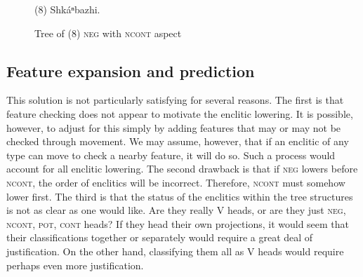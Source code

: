 \documentclass[output=paper]{LSP/langsci}
\begin{document}
\begin{figure}
\caption{Tree of (8) \textsc{neg} with \textsc{ncont} aspect} \label{treeof8}
\begin{center}
(8)	Shkáⁿbazhi.	

\end{center}
\end{figure}

\subsection{Feature expansion and prediction}
This solution is not particularly satisfying for several reasons. The first is that feature checking does not appear to motivate the enclitic lowering. It is possible, however, to adjust for this simply by adding features that may or may not be checked through movement. We may assume, however, that if an enclitic of any type can move to check a nearby feature, it will do so. Such a process would account for all enclitic lowering. The second drawback is that if \textsc{neg} lowers before \textsc{ncont}, the order of enclitics will be incorrect. Therefore, \textsc{ncont} must somehow lower first. The third is that the status of the enclitics within the tree structures is not as clear as one would like. Are they really V heads, or are they just \textsc{neg, ncont, pot, cont} heads? If they head their own projections, it would seem that their classifications together or separately would require a great deal of justification. On the other hand, classifying them all as V heads would require perhaps even more justification.
\end{document}
